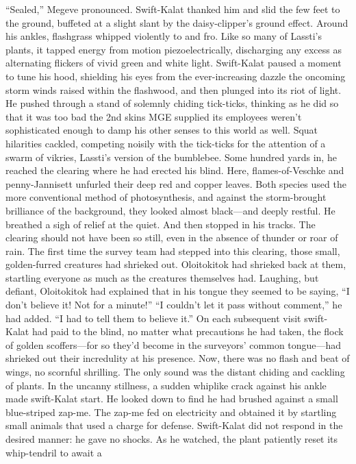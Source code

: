 \documentclass[9pt]{article}
\begin{document}
“Sealed,” Megeve pronounced.
Swift-Kalat thanked him and slid the few feet to the ground, buffeted at a slight slant by the
daisy-clipper’s ground effect. Around his ankles, flashgrass whipped violently to and fro. Like so many of
Lassti’s plants, it tapped energy from motion piezoelectrically, discharging any excess as alternating
flickers of vivid green and white light. Swift-Kalat paused a moment to tune his hood, shielding his eyes
from the ever-increasing dazzle the oncoming storm winds raised within the flashwood, and then plunged
into its riot of light.
He pushed through a stand of solemnly chiding tick-ticks, thinking as he did so that it was too bad the
2nd skins MGE supplied its employees weren’t sophisticated enough to damp his other senses to this
world as well. Squat hilarities cackled, competing noisily with the tick-ticks for the attention of a swarm
of vikries, Lassti’s version of the bumblebee.
Some hundred yards in, he reached the clearing where he had erected his blind. Here,
flames-of-Veschke and penny-Jannisett unfurled their deep red and copper leaves. Both species used the
more conventional method of photosynthesis, and against the storm-brought brilliance of the background,
they looked almost black—and deeply restful. He breathed a sigh of relief at the quiet.
And then stopped in his tracks. The clearing should not have been so still, even in the absence of
thunder or roar of rain.
The first time the survey team had stepped into this clearing, those small, golden-furred creatures had
shrieked out. Oloitokitok had shrieked back at them, startling everyone as much as the creatures
themselves had. Laughing, but defiant, Oloitokitok had explained that in his tongue they seemed to be
saying, “I don’t believe it! Not for a minute!”
“I couldn’t let it pass without comment,” he had added. “I had to tell them to believe it.”
On each subsequent visit swift-Kalat had paid to the blind, no matter what precautions he had taken,
the flock of golden scoffers—for so they’d become in the surveyors’ common tongue—had shrieked out
their incredulity at his presence.
Now, there was no flash and beat of wings, no scornful shrilling. The only sound was the distant
chiding and cackling of plants.
In the uncanny stillness, a sudden whiplike crack against his ankle made swift-Kalat start. He looked
down to find he had brushed against a small blue-striped zap-me. The zap-me fed on electricity and
obtained it by startling small animals that used a charge for defense. Swift-Kalat did not respond in the
desired manner: he gave no shocks. As he watched, the plant patiently reset its whip-tendril to await a
\end{document}
